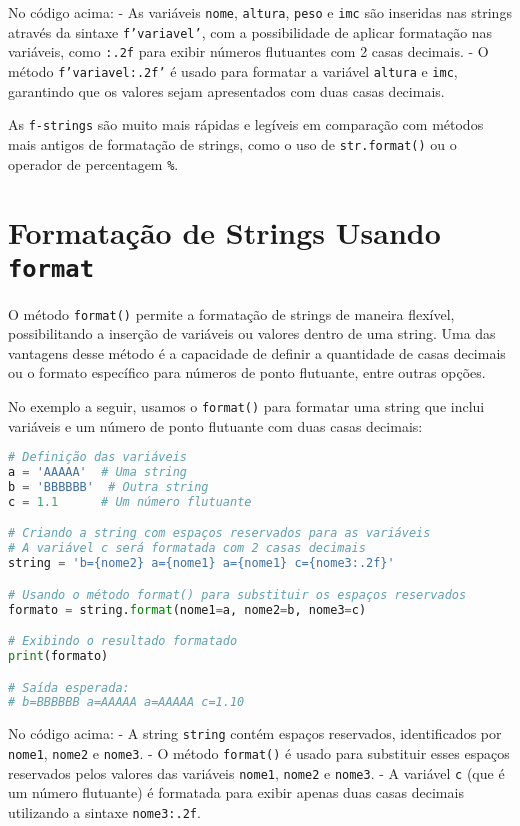 \documentclass{article}
\begin{document}
No código acima:
- As variáveis \texttt{nome}, \texttt{altura}, \texttt{peso} e \texttt{imc} são inseridas nas strings através da sintaxe \texttt{f'{variavel}'}, com a possibilidade de aplicar formatação nas variáveis, como \texttt{:.2f} para exibir números flutuantes com 2 casas decimais.
- O método \texttt{f'{variavel:.2f}'} é usado para formatar a variável \texttt{altura} e \texttt{imc}, garantindo que os valores sejam apresentados com duas casas decimais.

As \texttt{f-strings} são muito mais rápidas e legíveis em comparação com métodos mais antigos de formatação de strings, como o uso de \texttt{str.format()} ou o operador de percentagem \texttt{\%}.
\section{Formatação de Strings Usando \texttt{format}}

O método \texttt{format()} permite a formatação de strings de maneira flexível, possibilitando a inserção de variáveis ou valores dentro de uma string. Uma das vantagens desse método é a capacidade de definir a quantidade de casas decimais ou o formato específico para números de ponto flutuante, entre outras opções.

No exemplo a seguir, usamos o \texttt{format()} para formatar uma string que inclui variáveis e um número de ponto flutuante com duas casas decimais:

\begin{lstlisting}[language=Python]
# Definição das variáveis
a = 'AAAAA'  # Uma string
b = 'BBBBBB'  # Outra string
c = 1.1      # Um número flutuante

# Criando a string com espaços reservados para as variáveis
# A variável c será formatada com 2 casas decimais
string = 'b={nome2} a={nome1} a={nome1} c={nome3:.2f}'

# Usando o método format() para substituir os espaços reservados
formato = string.format(nome1=a, nome2=b, nome3=c)

# Exibindo o resultado formatado
print(formato)

# Saída esperada:
# b=BBBBBB a=AAAAA a=AAAAA c=1.10
\end{lstlisting}

No código acima:
- A string \texttt{string} contém espaços reservados, identificados por \texttt{{nome1}}, \texttt{{nome2}} e \texttt{{nome3}}.
- O método \texttt{format()} é usado para substituir esses espaços reservados pelos valores das variáveis \texttt{nome1}, \texttt{nome2} e \texttt{nome3}.
- A variável \texttt{c} (que é um número flutuante) é formatada para exibir apenas duas casas decimais utilizando a sintaxe \texttt{{nome3:.2f}}.
\end{document}
